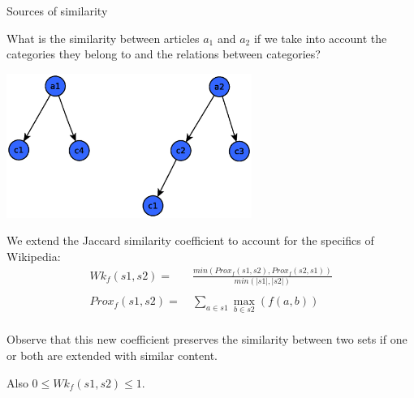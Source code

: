 \documentclass[xcolor=dvipsnames]{beamer}
\newcommand{\wikiJack}[3]{Wk_{#1}(#2,#3)}
\newcommand{\setProximity}[3]{Prox_{#1}(#2,#3)}
\begin{document}
\begin{frame}{Sources of similarity}


What is the similarity between articles $a_1$ and $a_2$  if we take into account the categories they belong to and the relations between categories?


\begin{center}

\includegraphics[width=0.6\textwidth, height=0.4\paperheight]{media/sim0.5.eps}

\end{center}

\end{frame}







\begin{frame}
We extend the Jaccard similarity coefficient to account for the specifics of Wikipedia:
\begin{align*}	
\wikiJack{f}{s1}{s2} =&\ \frac{min(\setProximity{f}{s1}{s2}, \setProximity{f}{s2}{s1})}{min(|s1|,|s2|)}\\
\\
\setProximity{f}{s1}{s2} =&\ \sum\limits_{a \in s1} \max\limits_{b \in s2}(f(a,b))\\
\end{align*}

Observe that this new coefficient preserves the similarity between two sets if one or both are extended with similar content.

Also $ 0 \leq \wikiJack{f}{s1}{s2} \leq 1 $.
  
\end{frame}
\end{document}

